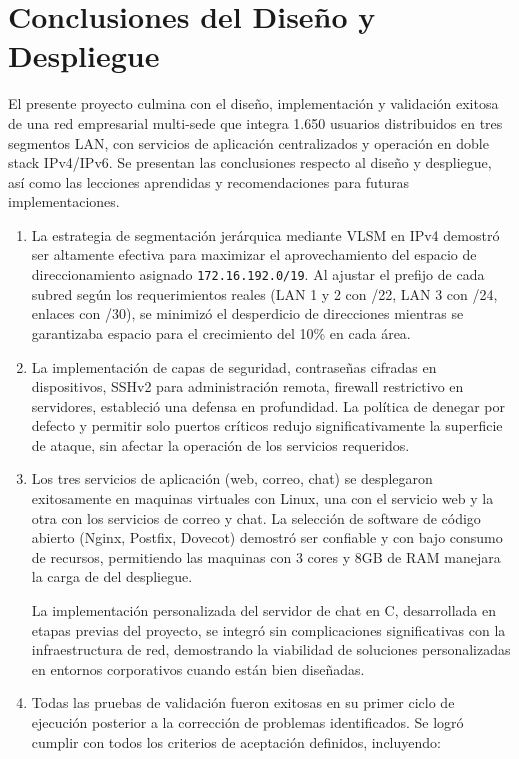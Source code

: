 \section{Conclusiones del Diseño y Despliegue}

El presente proyecto culmina con el diseño, implementación y validación exitosa
de una red empresarial multi-sede que integra 1.650 usuarios distribuidos en
tres segmentos LAN, con servicios de aplicación centralizados y operación en
doble stack IPv4/IPv6. Se presentan las conclusiones respecto al diseño y
despliegue, así como las lecciones aprendidas y recomendaciones para futuras
implementaciones.

\begin{enumerate}
   \item 
La estrategia de segmentación jerárquica mediante VLSM en IPv4 demostró ser
altamente efectiva para maximizar el aprovechamiento del espacio de
direccionamiento asignado \texttt{172.16.192.0/19}. Al ajustar el prefijo de
cada subred según los requerimientos reales (LAN 1 y 2 con /22, LAN 3 con /24,
enlaces con /30), se minimizó el desperdicio de direcciones mientras se
garantizaba espacio para el crecimiento del 10\% en cada área.


\item
La implementación de capas de seguridad, contraseñas cifradas en dispositivos,
SSHv2 para administración remota, firewall restrictivo en servidores, estableció
una defensa en profundidad. La política de denegar por defecto y permitir solo
puertos críticos redujo significativamente la superficie de ataque, sin afectar
la operación de los servicios requeridos.

\item
Los tres servicios de aplicación (web, correo, chat) se desplegaron exitosamente
en maquinas virtuales con Linux, una con el servicio web y la otra con los 
servicios de correo y chat. La selección de software de código abierto
(Nginx, Postfix, Dovecot) demostró ser confiable y con bajo consumo de recursos,
permitiendo las maquinas con 3 cores y 8GB de RAM manejara la carga de
del despliegue.

La implementación personalizada del servidor de chat en C, desarrollada en etapas
previas del proyecto, se integró sin complicaciones significativas con la
infraestructura de red, demostrando la viabilidad de soluciones personalizadas
en entornos corporativos cuando están bien diseñadas.

\item
Todas las pruebas de validación fueron exitosas en su primer ciclo de ejecución
posterior a la corrección de problemas identificados. Se logró cumplir con todos los criterios de aceptación definidos, incluyendo:


\end{enumerate}
